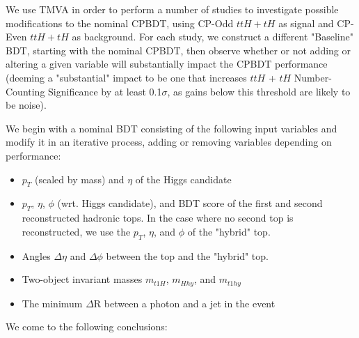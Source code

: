 We use TMVA in order to perform a number of studies to investigate possible modifications to the nominal CPBDT, using CP-Odd $ttH+tH$ as signal and CP-Even $ttH+tH$ as background. For each study, we construct a different "Baseline" BDT, starting with the nominal CPBDT, then observe whether or not adding or altering a given variable will substantially impact the CPBDT performance (deeming a "substantial" impact to be one that increases $ttH$ + $tH$ Number-Counting Significance by at least 0.1$\sigma$, as gains below this threshold are likely to be noise).

We begin with a nominal BDT consisting of the following input variables and modify it in an iterative process, adding or removing variables depending on performance:

\begin{itemize}
\item $p_{T}$ (scaled by mass) and $\eta$ of the Higgs candidate
\item $p_{T}$, $\eta$, $\phi$ (wrt. Higgs candidate), and BDT score of the first and second reconstructed hadronic tops. In the case where no second top is reconstructed, we use the $p_{T}$, $\eta$, and $\phi$ of the "hybrid" top.
\item Angles $\Delta\eta$ and $\Delta\phi$ between the top and the "hybrid" top.
\item Two-object invariant masses $m_{t1H}$, $m_{Hhy}$, and $m_{t1hy}$
\item The minimum $\Delta$R between a photon and a jet in the event
\end{itemize}

We come to the following conclusions:

